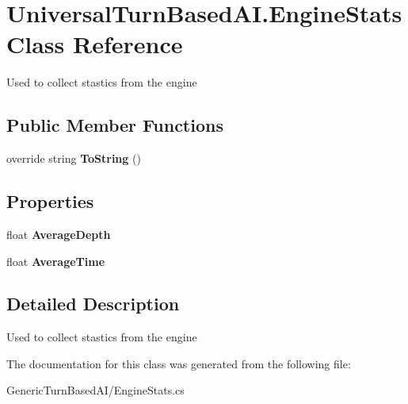 \hypertarget{class_universal_turn_based_a_i_1_1_engine_stats}{}\section{Universal\+Turn\+Based\+A\+I.\+Engine\+Stats Class Reference}
\label{class_universal_turn_based_a_i_1_1_engine_stats}


Used to collect stastics from the engine  


\subsection*{Public Member Functions}
\begin{DoxyCompactItemize}
\item 
\hypertarget{class_universal_turn_based_a_i_1_1_engine_stats_a0ca41bdff15ab826164c7b18372dfdfe}{}override string {\bfseries To\+String} ()\label{class_universal_turn_based_a_i_1_1_engine_stats_a0ca41bdff15ab826164c7b18372dfdfe}

\end{DoxyCompactItemize}
\subsection*{Properties}
\begin{DoxyCompactItemize}
\item 
\hypertarget{class_universal_turn_based_a_i_1_1_engine_stats_a25516088036ee544e3e77b595f869ddb}{}float {\bfseries Average\+Depth}\label{class_universal_turn_based_a_i_1_1_engine_stats_a25516088036ee544e3e77b595f869ddb}

\item 
\hypertarget{class_universal_turn_based_a_i_1_1_engine_stats_a212a53757938dbae571ac6a332371103}{}float {\bfseries Average\+Time}\label{class_universal_turn_based_a_i_1_1_engine_stats_a212a53757938dbae571ac6a332371103}

\end{DoxyCompactItemize}


\subsection{Detailed Description}
Used to collect stastics from the engine 



The documentation for this class was generated from the following file\+:\begin{DoxyCompactItemize}
\item 
Generic\+Turn\+Based\+A\+I/Engine\+Stats.\+cs\end{DoxyCompactItemize}
